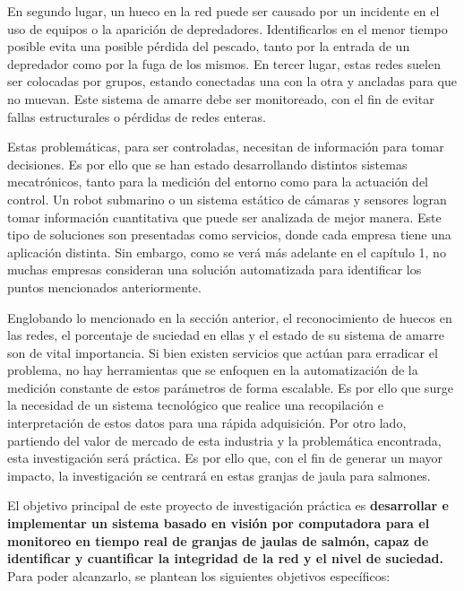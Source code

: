 En segundo lugar, un hueco en la red puede ser causado por un incidente en el uso de equipos o la aparición de depredadores. Identificarlos en el menor tiempo posible evita una posible pérdida del pescado, tanto por la entrada de un depredador como por la fuga de los mismos. En tercer lugar, estas redes suelen ser colocadas por grupos, estando conectadas una con la otra y ancladas para que no muevan. Este sistema de amarre debe ser monitoreado, con el fin de evitar fallas estructurales o pérdidas de redes enteras. 

Estas problemáticas, para ser controladas, necesitan de información para tomar decisiones. Es por ello que se han estado desarrollando distintos sistemas mecatrónicos, tanto para la medición del entorno como para la actuación del control. Un robot submarino o un sistema estático de cámaras y sensores logran tomar información cuantitativa que puede ser analizada de mejor manera. Este tipo de soluciones son presentadas como servicios, donde cada empresa tiene una aplicación distinta. Sin embargo, como se verá más adelante en el capítulo 1, no muchas empresas consideran una solución automatizada para identificar los puntos mencionados anteriormente. 


Englobando lo mencionado en la sección anterior, el reconocimiento de huecos en las redes, el porcentaje de suciedad en ellas y el estado de su sistema de amarre son de vital importancia. Si bien existen servicios que actúan para erradicar el problema, no hay herramientas que se enfoquen en la automatización de la medición constante de estos parámetros de forma escalable. Es por ello que surge la necesidad de un sistema tecnológico que realice una recopilación e interpretación de estos datos para una rápida adquisición. Por otro lado, partiendo del valor de mercado de esta industria y la problemática encontrada, esta investigación será práctica. Es por ello que, con el fin de generar un mayor impacto, la investigación se centrará en estas granjas de jaula para salmones.  


El objetivo principal de este proyecto de investigación práctica es \textbf{desarrollar e implementar un sistema basado en visión por computadora para el monitoreo en tiempo real de granjas de jaulas de salmón, capaz de identificar y cuantificar la integridad de la red y el nivel de suciedad.} Para poder alcanzarlo, se plantean los siguientes objetivos específicos:

